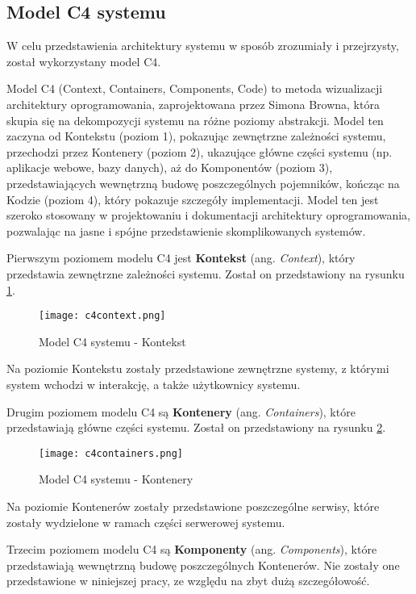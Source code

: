 \subsection{Model C4 systemu}

W celu przedstawienia architektury systemu w sposób zrozumiały i przejrzysty, został wykorzystany model C4.

Model C4 (Context, Containers, Components, Code) to metoda wizualizacji architektury oprogramowania, zaprojektowana przez Simona Browna, która skupia się na dekompozycji systemu na różne poziomy abstrakcji. Model ten zaczyna od Kontekstu (poziom 1), pokazując zewnętrzne zależności systemu, przechodzi przez Kontenery (poziom 2), ukazujące główne części systemu (np. aplikacje webowe, bazy danych), aż do Komponentów (poziom 3), przedstawiających wewnętrzną budowę poszczególnych pojemników, kończąc na Kodzie (poziom 4), który pokazuje szczegóły implementacji. Model ten jest szeroko stosowany w projektowaniu i dokumentacji architektury oprogramowania, pozwalając na jasne i spójne przedstawienie skomplikowanych systemów.

Pierwszym poziomem modelu C4 jest \textbf{Kontekst} (ang. \textit{Context}), który przedstawia zewnętrzne zależności systemu. Został on przedstawiony na rysunku \ref{fig:c4context}.

\begin{figure}[!h]
    \centering \texttt{[image: c4context.png]}
    \caption{Model C4 systemu - Kontekst}
    \label{fig:c4context}
\end{figure}

Na poziomie Kontekstu zostały przedstawione zewnętrzne systemy, z którymi system wchodzi w interakcję, a także użytkownicy systemu.

Drugim poziomem modelu C4 są \textbf{Kontenery} (ang. \textit{Containers}), które przedstawiają główne części systemu. Został on przedstawiony na rysunku \ref{fig:c4containers}.

\begin{figure}[!h]
    \centering \texttt{[image: c4containers.png]}
    \caption{Model C4 systemu - Kontenery}
    \label{fig:c4containers}
\end{figure}

Na poziomie Kontenerów zostały przedstawione poszczególne serwisy, które zostały wydzielone w ramach części serwerowej systemu.

Trzecim poziomem modelu C4 są \textbf{Komponenty} (ang. \textit{Components}), które przedstawiają wewnętrzną budowę poszczególnych Kontenerów. Nie zostały one przedstawione w niniejszej pracy, ze względu na zbyt dużą szczegółowość. 

